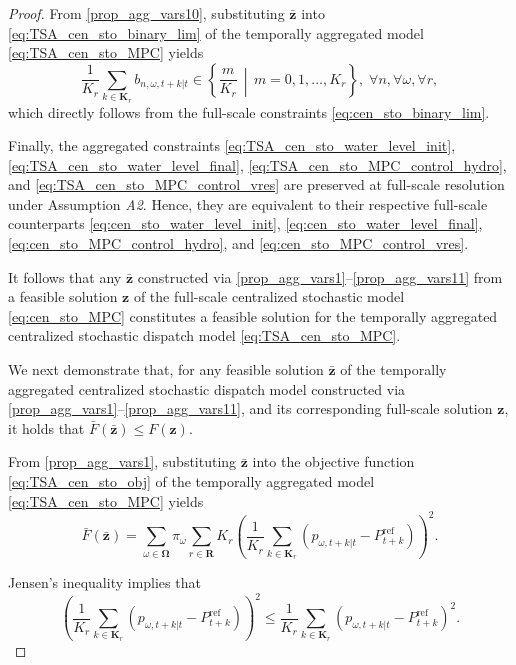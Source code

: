 \documentclass[a4paper,fleqn]{cas-sc}
\begin{document}
\begin{proof}
From \eqref{prop_agg_vars10}, substituting $\boldsymbol{\bar{z}}$ into
\eqref{eq:TSA_cen_sto_binary_lim} of the temporally aggregated model
\eqref{eq:TSA_cen_sto_MPC} yields
\begin{equation}
\frac{1}{K_r} \sum_{k \in \boldsymbol{K}_r}
b_{n,\omega,t+k|t} \in \left\{ \frac{m}{K_r} \,\middle|\, m = 0,1,\dots,K_r \right\}, \; \forall n, \forall \omega, \forall r,
\end{equation}
which directly follows from the full-scale constraints \eqref{eq:cen_sto_binary_lim}.

Finally, the aggregated constraints
\eqref{eq:TSA_cen_sto_water_level_init},
\eqref{eq:TSA_cen_sto_water_level_final},
\eqref{eq:TSA_cen_sto_MPC_control_hydro}, and
\eqref{eq:TSA_cen_sto_MPC_control_vres}
are preserved at full-scale resolution under Assumption \textit{A2}.
Hence, they are equivalent to their respective full-scale counterparts
\eqref{eq:cen_sto_water_level_init},
\eqref{eq:cen_sto_water_level_final},
\eqref{eq:cen_sto_MPC_control_hydro}, and
\eqref{eq:cen_sto_MPC_control_vres}.

It follows that any $\boldsymbol{\bar{z}}$ constructed via \eqref{prop_agg_vars1}--\eqref{prop_agg_vars11} from a feasible solution $\boldsymbol{z}$ of the full-scale centralized stochastic model \eqref{eq:cen_sto_MPC}
constitutes a feasible solution for the temporally aggregated centralized stochastic dispatch model \eqref{eq:TSA_cen_sto_MPC}.

We next demonstrate that, for any feasible solution $\boldsymbol{\bar{z}}$ of the temporally aggregated centralized stochastic dispatch model constructed via
\eqref{prop_agg_vars1}--\eqref{prop_agg_vars11}, and its corresponding full-scale solution $\boldsymbol{z}$,
it holds that $\bar{F}(\boldsymbol{\bar{z}}) \leq F(\boldsymbol{z})$.

From \eqref{prop_agg_vars1}, substituting $\boldsymbol{\bar{z}}$ into the objective function \eqref{eq:TSA_cen_sto_obj} of the temporally aggregated model \eqref{eq:TSA_cen_sto_MPC} yields
\begin{equation}
\bar{F}(\boldsymbol{\bar{z}}) =
\sum_{\omega \in \boldsymbol{\Omega}}
\pi_{\omega}
\sum_{r \in \boldsymbol{R}} K_r
\left(
\frac{1}{K_r} \sum_{k \in \boldsymbol{K}_r}
\left(p_{\omega,t+k|t} - P^{\mathrm{ref}}_{t+k}\right)
\right)^2.
\label{prop:proof_obj1}
\end{equation}

Jensen’s inequality implies that
\begin{equation}
\left(\frac{1}{K_r} \sum_{k \in \boldsymbol{K}_r}
\left(p_{\omega,t+k|t} - P^{\mathrm{ref}}_{t+k}\right)
\right)^2
\leq
\frac{1}{K_r} \sum_{k \in \boldsymbol{K}_r}
\left(p_{\omega,t+k|t} - P^{\mathrm{ref}}_{t+k}\right)^2.
\label{prop:proof_obj2}
\end{equation}


\end{proof}
\end{document}
